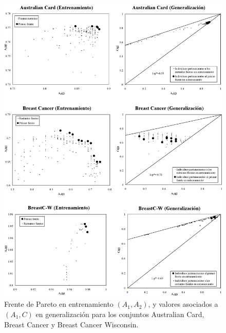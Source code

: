 \clearpage
\begin{figure}[!htb]
\centering
	\includegraphics[keepaspectratio,width=13cm]{figuras/tanda1.jpg}
\caption{Frente de Pareto en entrenamiento $(A_{1},A_{2})$, y valores asociados a
$(A_{1},C)$ en generalización para los conjuntos Australian Card, Breast Cancer y
Breast Cancer Wisconsin.}
\label{tanda1}
\end{figure}

